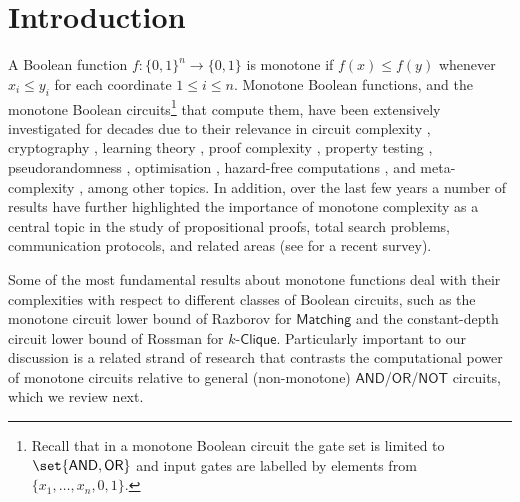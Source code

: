\documentclass[11pt]{article}
\begin{document}
\newpage  
\setcounter{tocdepth}{3}  
  
\tableofcontents

\newpage



\vspace{-0.4cm}

\section{Introduction}






A Boolean function $f \colon \{0,1\}^n \to \{0,1\}$ is monotone if $f(x) \leq f(y)$ whenever $x_i \leq y_i$ for each coordinate $1 \leq i \leq n$. Monotone Boolean functions, and the monotone Boolean circuits\footnote{Recall that in a monotone Boolean circuit the gate set is limited to
$\set{\mathsf{AND}, \mathsf{OR}}$ and input gates are labelled by elements from $\{x_1, \ldots, x_n, 0, 1\}$.} that compute them, have been extensively investigated for decades due to their relevance in circuit complexity  \citep{razborov_boolean_85}, cryptography \citep{DBLP:conf/crypto/Leichter88}, learning theory \citep{DBLP:journals/jacm/BshoutyT96},  proof complexity \citep{Krajicek97, DBLP:journals/jsyml/Pudlak97}, property testing \citep{DBLP:conf/focs/GoldreichGLR98}, pseudorandomness \citep{DBLP:conf/stoc/ChattopadhyayZ16}, optimisation \citep{gjw18}, hazard-free computations \citep{DBLP:journals/jacm/IkenmeyerKLLMS19}, and meta-complexity \citep{Hir22}, among other topics. In addition, over the last few years a number of results have further  highlighted the importance of monotone complexity as a central topic in the study of propositional proofs, total search problems, communication protocols, and related areas (see \citep{DBLP:journals/sigact/RezendeGR22} for a recent survey). 

Some of the most fundamental results about monotone functions deal with their complexities with respect to different classes of Boolean circuits, such as the monotone circuit lower bound of Razborov \citep{razborov1985lower} for $\mathsf{Matching}$ and the constant-depth circuit lower bound of Rossman \citep{DBLP:conf/stoc/Rossman08} for $k$-$\mathsf{Clique}$. Particularly important to our discussion is a related strand of research that contrasts the computational power of monotone circuits relative to general (non-monotone) $\mathsf{AND}$/$\mathsf{OR}$/$\mathsf{NOT}$ circuits, which we review next.
\end{document}
